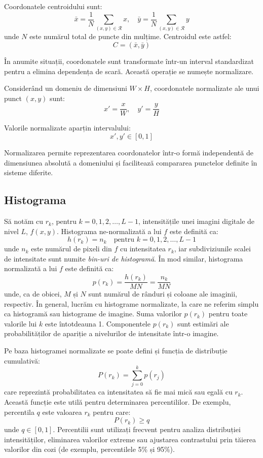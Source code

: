 Coordonatele centroidului sunt:
\[
    \bar{x} = \frac{1}{N} \sum_{(x,y) \in \mathcal{R}} x, \quad
    \bar{y} = \frac{1}{N} \sum_{(x,y) \in \mathcal{R}} y
\]
unde \( N \) este numărul total de puncte din mulțime. Centroidul este astfel:
\[
    C = (\bar{x}, \bar{y})
\]

În anumite situații, coordonatele sunt transformate într-un interval standardizat pentru a elimina dependența de scară. Această operație se numește normalizare.

Considerând un domeniu de dimensiuni \( W \times H \), coordonatele normalizate ale unui punct \( (x, y) \) sunt:
\[
    x' = \frac{x}{W}, \quad y' = \frac{y}{H}
\]

Valorile normalizate aparțin intervalului:
\[
    x', y' \in [0, 1]
\]

Normalizarea permite reprezentarea coordonatelor într-o formă independentă de dimensiunea absolută a domeniului și facilitează compararea punctelor definite în sisteme diferite.

\subsection*{Histograma}

Să notăm cu $r_k$, pentru $k = 0, 1, 2, \ldots, L-1$, intensitățile unei imagini digitale de nivel $L$, $f(x, y)$. Histograma ne-normalizată a lui $f$ este definită ca:
\[
    h(r_k) = n_k \quad \text{pentru } k = 0, 1, 2, \ldots, L-1
\]
unde $n_k$ este numărul de pixeli din $f$ cu intensitatea $r_k$, iar subdiviziunile scalei de intensitate sunt numite \textit{bin-uri de histogramă}. În mod similar, histograma normalizată a lui $f$ este definită ca:
\[
    p(r_k) = \frac{h(r_k)}{MN} = \frac{n_k}{MN}
\]
unde, ca de obicei, $M$ și $N$ sunt numărul de rânduri și coloane ale imaginii, respectiv. În general, lucrăm cu histograme normalizate, la care ne referim simplu ca histogramă sau histograme de imagine. Suma valorilor $p(r_k)$ pentru toate valorile lui $k$ este întotdeauna 1. Componentele $p(r_k)$ sunt estimări ale probabilităților de apariție a nivelurilor de intensitate într-o imagine.

Pe baza histogramei normalizate se poate defini și funcția de distribuție cumulativă:
\[
    P(r_k) = \sum_{j=0}^{k} p(r_j)
\]
care reprezintă probabilitatea ca intensitatea să fie mai mică sau egală cu $r_k$. Această funcție este utilă pentru determinarea percentililor. De exemplu, percentila $q$ este valoarea $r_k$ pentru care:
\[
    P(r_k) \geq q
\]
unde $q \in [0,1]$. Percentilii sunt utilizați frecvent pentru analiza distribuției intensităților, eliminarea valorilor extreme sau ajustarea contrastului prin tăierea valorilor din cozi (de exemplu, percentilele 5\% și 95\%).

